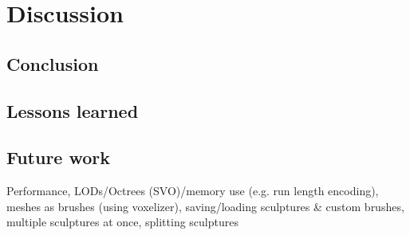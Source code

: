\chapter{Discussion}

\section{Conclusion}

\section{Lessons learned}

\section{Future work}
Performance, LODs/Octrees (SVO)/memory use (e.g. run length encoding), meshes as brushes (using voxelizer), saving/loading sculptures \& custom brushes, multiple sculptures at once,
splitting sculptures